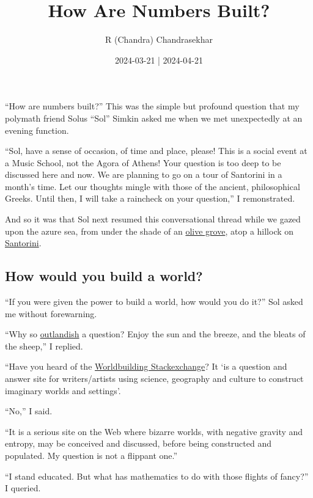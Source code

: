 \documentclass[
  a4paper,
]{article}
\title{How Are Numbers Built?}
\author{R (Chandra) Chandrasekhar}
\date{2024-03-21 | 2024-04-21}
\begin{document}
\maketitle

\thispagestyle{empty}


``How are numbers built?'' This was the simple but profound question
that my polymath friend Solus ``Sol'' Simkin asked me when we met
unexpectedly at an evening function.

``Sol, have a sense of occasion, of time and place, please! This is a
social event at a Music School, not the Agora of Athens! Your question
is too deep to be discussed here and now. We are planning to go on a
tour of Santorini in a month's time. Let our thoughts mingle with those
of the ancient, philosophical Greeks. Until then, I will take a
raincheck on your question,'' I remonstrated.

And so it was that Sol next resumed this conversational thread while we
gazed upon the azure sea, from under the shade of an
\href{http://wedding.beleon.com/media/15172-beleontoursgreeceweddingsantoriniolivegrove.jpg}{olive
grove}, atop a hillock on
\href{https://en.wikipedia.org/wiki/Santorini}{Santorini}.

\subsection{How would you build a
world?}\label{how-would-you-build-a-world}

``If you were given the power to build a world, how would you do it?''
Sol asked me without forewarning.

``Why so
\href{https://dictionary.cambridge.org/dictionary/english/outlandish}{outlandish}
a question? Enjoy the sun and the breeze, and the bleats of the sheep,''
I replied.

``Have you heard of the
\href{https://worldbuilding.stackexchange.com/}{Worldbuilding
Stackexchange}? It `is a question and answer site for writers/artists
using science, geography and culture to construct imaginary worlds and
settings'.

``No,'' I said.

``It is a serious site on the Web where bizarre worlds, with negative
gravity and entropy, may be conceived and discussed, before being
constructed and populated. My question is not a flippant one.''

``I stand educated. But what has mathematics to do with those flights of
fancy?'' I queried.
\end{document}
